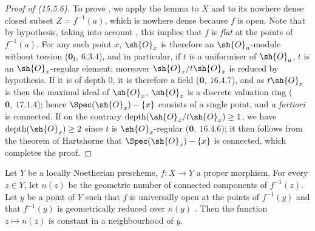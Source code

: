 \begin{proof}[Proof of {\rm (15.5.6)}]
To prove , we apply the lemma  to $X$ and to its nowhere dense closed subset $Z=f^{-1}(a)$, which is nowhere dense because $f$ is open.
Note that by hypothesis, taking into account , this implies that $f$ is \emph{flat} at the points of $f^{-1}(a)$.
For any such point $x$, $\sh{O}_x$ is therefore an $\sh{O}_a$-module without torsion ($\mathbf{0}_{\mathrm{I}},~6.3.4$), and in particular, if $t$ is a uniformiser of $\sh{O}_a$, $t$ is an $\sh{O}_x$-regular element; moreover $\sh{O}_x/t\sh{O}_x$ is reduced by hypothesis. If it is of depth $0$, it is therefore a field ($\mathbf{0},~16.4.7$), and as $t\sh{O}_x$ is then the maximal ideal of $\sh{O}_x$, $\sh{O}_x$ is a discrete valuation ring ($\mathbf{0},~17.1.4$); hence $\Spec(\sh{O}_x)-\{x\}$ consists of a single point, and \emph{a fortiori} is connected.
If on the contrary $\operatorname{depth}(\sh{O}_x/t\sh{O}_x)\geq 1$, we have $\operatorname{depth}(\sh{O}_x)\geq 2$ since $t$ is $\sh{O}_x$-regular ($\mathbf{0},~16.4.6$); it then follows from the theorem of Hartshorne  that $\Spec(\sh{O}_x)-\{x\}$ is connected, which completes the proof.
\end{proof}

\begin{proposition}[15.5.7]
\label{IV.15.5.7}
Let $Y$ be a locally Noetherian prescheme, $f:X\to Y$ a proper morphism.
For every $z\in Y$, let $n(z)$ be the geometric number of connected components of $f^{-1}(z)$.
Let $y$ be a point of $Y$ such that $f$ is universally open at the points of $f^{-1}(y)$ and that $f^{-1}(y)$ is geometrically reduced over $\kappa(y)$ .
Then the function $z\mapsto n(z)$ is constant in a neighbourhood of $y$.
\end{proposition}

